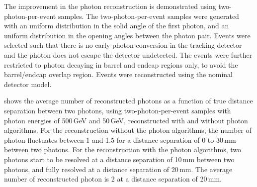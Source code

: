 The improvement in the photon reconstruction is demonstrated using  two-photon-per-event samples. The two-photon-per-event samples were generated with an uniform distribution in the solid angle of the first photon, and an uniform distribution in the opening angles  between the photon pair. Events were selected such that there is no early photon conversion in the tracking detector and the photon does not escape the detector undetected. The events were further restricted to photon decaying in barrel and endcap regions only, to avoid the barrel/endcap overlap region. Events were reconstructed using the nominal \ILD detector model.


 shows the average number of reconstructed photons as a function of true distance separation between two photons,   using  two-photon-per-event samples
with photon energies of  500\,GeV and 50\,GeV,   reconstructed with and without photon algorithms. For the reconstruction without the photon algorithms, the number of photon fluctuates between 1 and 1.5 for a distance separation of 0 to 30\,mm between two photons.  For the reconstruction with the photon algorithms, two photons start to be resolved at a distance separation  of 10\,mm between two photons, and fully resolved at a  distance separation of 20\,mm.  The average number of reconstructed photon is 2 at a  distance separation of 20\,mm.


